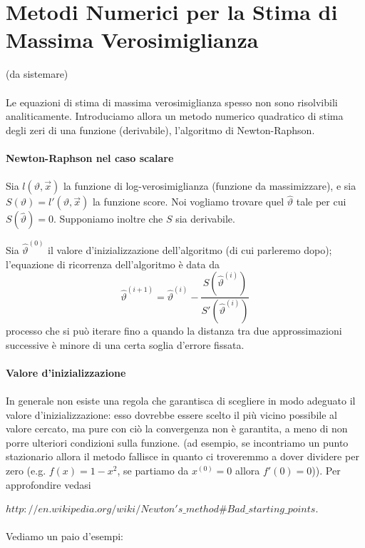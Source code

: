 \section{Metodi Numerici per la Stima di Massima Verosimiglianza}
(da sistemare)\\
\\
Le equazioni di stima di massima verosimiglianza spesso non sono risolvibili analiticamente.
Introduciamo allora un metodo numerico quadratico di stima degli zeri di una funzione (derivabile), l'algoritmo di Newton-Raphson.\\
\\
\textbf{Newton-Raphson nel caso scalare}\\
\\
Sia $l(\vartheta,\vec{x})$ la funzione di log-verosimiglianza (funzione da massimizzare), e sia $S(\vartheta) = l'(\vartheta, \vec{x})$ la funzione score.
Noi vogliamo trovare quel $\hat{\vartheta}$ tale per cui $S(\hat{\vartheta})=0$.
Supponiamo inoltre che $S$ sia derivabile.

Sia $\hat{\vartheta}^{(0)}$ il valore d'inizializzazione dell'algoritmo (di cui parleremo dopo); 
l'equazione di ricorrenza dell'algoritmo è data da
$$\hat{\vartheta}^{(i+1)} = \hat{\vartheta}^{(i)} - \frac{S(\hat{\vartheta}^{(i)})}{S'(\hat{\vartheta}^{(i)})}$$
processo che si può iterare fino a quando la distanza tra due approssimazioni successive è minore di una certa soglia d'errore fissata.\\
\\
\textbf{Valore d'inizializzazione}\\
\\
In generale non esiste una regola che garantisca di scegliere in modo adeguato il valore d'inizializzazione: esso dovrebbe essere scelto il più vicino possibile al valore cercato, ma pure con ciò la convergenza non è garantita, a meno di non porre ulteriori condizioni sulla funzione.
(ad esempio, se incontriamo un punto stazionario allora il metodo fallisce in quanto ci troveremmo a dover dividere per zero (e.g. $f(x)=1-x^2$, se partiamo da $x^{(0)}=0$ allora $f'(0)=0$)).
Per approfondire vedasi 

\href{http://en.wikipedia.org/wiki/Newton%27s_method#Bad_starting_points}{$http://en.wikipedia.org/wiki/Newton's\_method\#Bad\_starting\_points$}.\\
\\
Vediamo un paio d'esempi:\\

